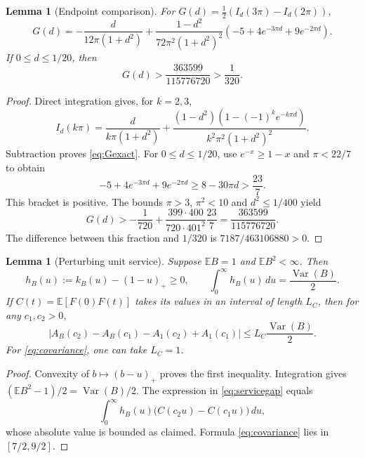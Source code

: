 \documentclass[10pt,a4paper]{amsart}
\numberwithin{equation}{section}
\newtheorem{lemma}[theorem]{Lemma}
\newcommand{\E}{\mathbb E}
\newcommand{\1}{\mathbf 1}
\DeclareMathOperator{\Var}{Var}
\begin{document}
\begin{lemma}[Endpoint comparison]\label{lem:endpointgap}
For $G(d)=\tfrac12(I_d(3\pi)-I_d(2\pi))$,
\begin{equation}\label{eq:Gexact}
 G(d)=-\frac{d}{12\pi(1+d^2)}
 +\frac{1-d^2}{72\pi^2(1+d^2)^2}
 \left(-5+4e^{-3\pi d}+9e^{-2\pi d}\right).
\end{equation}
If $0\le d\le1/20$, then
\begin{equation}\label{eq:Gbound}
 G(d)>\frac{363599}{115776720}>\frac1{320}.
\end{equation}
\end{lemma}
\begin{proof}
Direct integration gives, for $k=2,3$,
\[
 I_d(k\pi)=\frac{d}{k\pi(1+d^2)}
 +\frac{(1-d^2)(1-(-1)^ke^{-k\pi d})}{k^2\pi^2(1+d^2)^2}.
\]
Subtraction proves \eqref{eq:Gexact}. For $0\le d\le1/20$, use $e^{-x}\ge1-x$ and $\pi<22/7$ to obtain
\[
 -5+4e^{-3\pi d}+9e^{-2\pi d}\ge8-30\pi d>\frac{23}{7}.
\]
This bracket is positive. The bounds $\pi>3$, $\pi^2<10$ and $d^2\le1/400$ yield
\[
 G(d)>-\frac1{720}
 +\frac{399\cdot400}{720\cdot401^2}\frac{23}{7}
 =\frac{363599}{115776720}.
\]
The difference between this fraction and $1/320$ is $7187/463106880>0$.
\end{proof}

\begin{lemma}[Perturbing unit service]\label{lem:service}
Suppose $\E B=1$ and $\E B^2<\infty$. Then
\begin{equation}\label{eq:kernelmass}
 h_B(u):=k_B(u)-(1-u)_+\ge0,
 \qquad \int_0^\infty h_B(u)\,du=\frac{\Var(B)}2.
\end{equation}
If $C(t)=\E[F(0)F(t)]$ takes its values in an interval of length $L_C$, then for any $c_1,c_2>0$,
\begin{equation}\label{eq:servicegap}
 \left|A_B(c_2)-A_B(c_1)-A_1(c_2)+A_1(c_1)\right|
 \le L_C\frac{\Var(B)}2.
\end{equation}
For \eqref{eq:covariance}, one can take $L_C=1$.
\end{lemma}
\begin{proof}
Convexity of $b\mapsto(b-u)_+$ proves the first inequality. Integration gives $(\E B^2-1)/2=\Var(B)/2$. The expression in \eqref{eq:servicegap} equals
\[
 \int_0^\infty h_B(u)\bigl(C(c_2u)-C(c_1u)\bigr)\,du,
\]
whose absolute value is bounded as claimed. Formula \eqref{eq:covariance} lies in $[7/2,9/2]$.
\end{proof}
\end{document}

